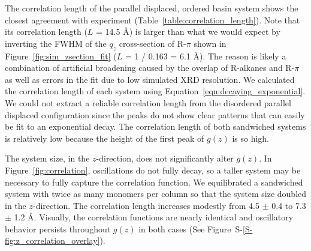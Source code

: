 \documentclass[journal=jpcbfk,manuscript=article]{achemso}
\begin{document}
  The correlation length of the parallel displaced, ordered basin system shows
  the closest agreement with experiment (Table~\ref{table:correlation_length}).
  Note that its correlation length ($L$ = 14.5 \AA) is larger than what we would 
  expect by inverting the FWHM of the $q_z$ cross-section of R-$\pi$ shown in 
  Figure~\ref{fig:sim_zsection_fit} ($L$ = 1 / 0.163 = 6.1 \AA). The reason is
  likely a combination of artificial broadening caused by the overlap of 
  R-alkanes and R-$\pi$ as well as errors in the fit due to low simulated 
  XRD resolution. We calculated the correlation length of each system using 
  Equation~\ref{eqn:decaying_exponential}. We could not extract a reliable 
  correlation length from the disordered parallel displaced configuration since
  the peaks do not show clear patterns that can easily be fit to an exponential
  decay. The correlation length of both sandwiched systems is relatively low
  because the height of the first peak of $g(z)$ is so high. 
  
  The system size, in the $z$-direction, does not significantly alter $g(z)$. 
  In Figure~\ref{fig:correlation}, oscillations do not fully decay, so a taller
  system may be necessary to fully capture the correlation function. We 
  equilibrated a sandwiched system with twice as many monomers per column 
  so that the system size doubled in the $z$-direction. The correlation length 
  increases modestly from 4.5 $\pm$ 0.4 to 7.3 $\pm$ 1.2 \AA. Visually, the
  correlation functions are nearly identical and oscillatory behavior persists
  throughout $g(z)$ in both cases (See Figure~S-\ref{S-fig:z_correlation_overlay}).

  
\end{document}
